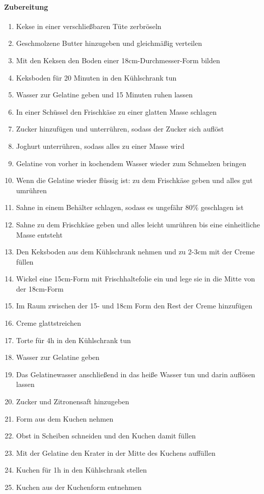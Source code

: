 \paragraph{Zubereitung}
\begin{enumerate}[noitemsep]
	\item Kekse in einer verschließbaren Tüte zerbröseln
	\item Geschmolzene Butter hinzugeben und gleichmäßig verteilen
	\item Mit den Keksen den Boden einer 18cm-Durchmesser-Form bilden
	\item Keksboden für 20 Minuten in den Kühlschrank tun
	\item Wasser zur Gelatine geben und 15 Minuten ruhen lassen
	\item In einer Schüssel den Frischkäse zu einer glatten Masse schlagen
	\item Zucker hinzufügen und unterrühren, sodass der Zucker sich auflöst
	\item Joghurt unterrühren, sodass alles zu einer Masse wird
	\item Gelatine von vorher in kochendem Wasser wieder zum Schmelzen bringen 
	\item Wenn die Gelatine wieder flüssig ist: zu dem Frischkäse geben und alles gut umrühren
	\item Sahne in einem Behälter schlagen, sodass es ungefähr 80\% geschlagen ist
	\item Sahne zu dem Frischkäse geben und alles leicht umrühren bis eine einheitliche Masse entsteht
	\item Den Keksboden aus dem Kühlschrank nehmen und zu 2-3cm mit der Creme füllen
	\item Wickel eine 15cm-Form mit Frischhaltefolie ein und lege sie in die Mitte von der 18cm-Form
	\item Im Raum zwischen der 15- und 18cm Form den Rest der Creme hinzufügen
	\item Creme glattstreichen
	\item Torte für 4h in den Kühlschrank tun
	\item Wasser zur Gelatine geben 
	\item Das Gelatinewasser anschließend in das heiße Wasser tun und darin auflösen lassen
	\item Zucker und Zitronensaft hinzugeben
	\item Form aus dem Kuchen nehmen
	\item Obst in Scheiben schneiden und den Kuchen damit füllen
	\item Mit der Gelatine den Krater in der Mitte des Kuchens auffüllen
	\item Kuchen für 1h in den Kühlschrank stellen
	\item Kuchen aus der Kuchenform entnehmen	
\end{enumerate}